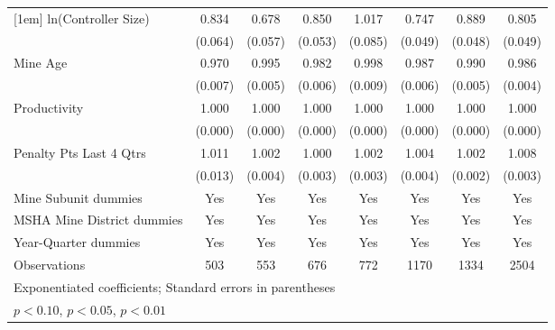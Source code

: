 {\begin{tabular}{l*{7}{c}}
[1em]
ln(Controller Size)      &       0.834\sym{**} &       0.678\sym{***}&       0.850\sym{***}&       1.017         &       0.747\sym{***}&       0.889\sym{**} &       0.805\sym{***}\\
                         &     (0.064)         &     (0.057)         &     (0.053)         &     (0.085)         &     (0.049)         &     (0.048)         &     (0.049)         \\
[1em]
Mine Age                 &       0.970\sym{***}&       0.995         &       0.982\sym{***}&       0.998         &       0.987\sym{**} &       0.990\sym{*}  &       0.986\sym{***}\\
                         &     (0.007)         &     (0.005)         &     (0.006)         &     (0.009)         &     (0.006)         &     (0.005)         &     (0.004)         \\
[1em]
Productivity             &       1.000         &       1.000         &       1.000\sym{***}&       1.000         &       1.000         &       1.000\sym{**} &       1.000         \\
                         &     (0.000)         &     (0.000)         &     (0.000)         &     (0.000)         &     (0.000)         &     (0.000)         &     (0.000)         \\
[1em]
Penalty Pts Last 4 Qtrs  &       1.011         &       1.002         &       1.000         &       1.002         &       1.004         &       1.002         &       1.008\sym{**} \\
                         &     (0.013)         &     (0.004)         &     (0.003)         &     (0.003)         &     (0.004)         &     (0.002)         &     (0.003)         \\
[1em]
Mine Subunit dummies     &         Yes         &         Yes         &         Yes         &         Yes         &         Yes         &         Yes         &         Yes         \\
[1em]
MSHA Mine District dummies&         Yes         &         Yes         &         Yes         &         Yes         &         Yes         &         Yes         &         Yes         \\
[1em]
Year-Quarter dummies     &         Yes         &         Yes         &         Yes         &         Yes         &         Yes         &         Yes         &         Yes         \\
\hline
Observations             &         503         &         553         &         676         &         772         &        1170         &        1334         &        2504         \\
\hline\hline
\multicolumn{8}{l}{\footnotesize Exponentiated coefficients; Standard errors in parentheses}\\
\multicolumn{8}{l}{\footnotesize \sym{*} \(p<0.10\), \sym{**} \(p<0.05\), \sym{***} \(p<0.01\)}\\
\end{tabular}
}
